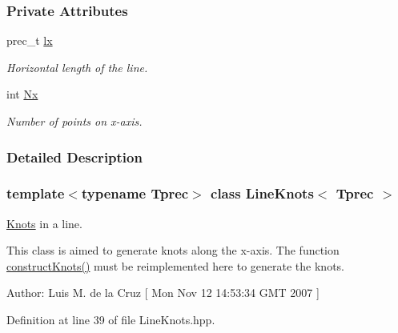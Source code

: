 \subsubsection*{Private Attributes}
\begin{CompactItemize}
\item 
\hypertarget{classLineKnots_8d04b614c6a92ee9dd5efc4bb70abe5c}{
prec\_\-t \hyperlink{classLineKnots_8d04b614c6a92ee9dd5efc4bb70abe5c}{lx}}
\label{classLineKnots_8d04b614c6a92ee9dd5efc4bb70abe5c}

\begin{CompactList}\small\item\em Horizontal length of the line. \item\end{CompactList}\item 
\hypertarget{classLineKnots_582ed5bd9f33961e755ff9c0bc71d1d3}{
int \hyperlink{classLineKnots_582ed5bd9f33961e755ff9c0bc71d1d3}{Nx}}
\label{classLineKnots_582ed5bd9f33961e755ff9c0bc71d1d3}

\begin{CompactList}\small\item\em Number of points on x-axis. \item\end{CompactList}\end{CompactItemize}


\subsubsection{Detailed Description}
\subsubsection*{template$<$typename Tprec$>$ class LineKnots$<$ Tprec $>$}

\hyperlink{classKnots}{Knots} in a line. 

This class is aimed to generate knots along the x-axis. The function \hyperlink{classLineKnots_de473737fc4dabcb3c4ce0bb56394e25}{constructKnots()} must be reimplemented here to generate the knots. \begin{Desc}
\item[Author:]Luis M. de la Cruz \mbox{[} Mon Nov 12 14:53:34 GMT 2007 \mbox{]} \end{Desc}


Definition at line 39 of file LineKnots.hpp.

